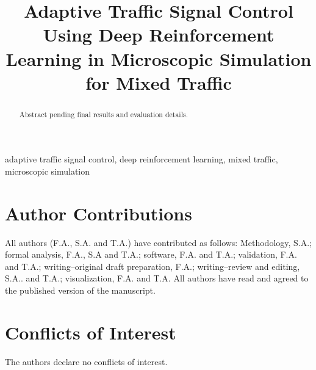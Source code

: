 \documentclass[conference]{IEEEtran}
\begin{document}
\title{Adaptive Traffic Signal Control Using Deep Reinforcement Learning in Microscopic Simulation for Mixed Traffic}

\author{
\and
{}
\and
{}
}

\maketitle

\begin{abstract}
Abstract pending final results and evaluation details.
\end{abstract}

\begin{IEEEkeywords}
adaptive traffic signal control, deep reinforcement learning, mixed traffic, microscopic simulation
\end{IEEEkeywords}











\section*{Author Contributions}
All authors (F.A., S.A. and T.A.) have contributed as follows: Methodology, S.A.; formal analysis, F.A., S.A and T.A.; software, F.A. and T.A.; validation, F.A. and T.A.; writing--original draft preparation, F.A.; writing--review and editing, S.A.. and T.A.; visualization, F.A. and T.A. All authors have read and agreed to the published version of the manuscript.

\section*{Conflicts of Interest}
The authors declare no conflicts of interest.

\nocite{*}


\end{document}
